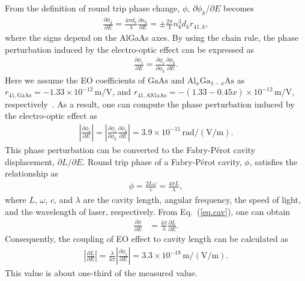 From the definition of round trip phase change, $\phi$, $\partial\phi_k/\partial E$ becomes
\begin{align}
\frac{\partial\phi_k}{\partial E} = \frac{4\pi d_k}{\lambda}\frac{\partial n_k}{\partial E} = \pm\frac{2\pi}{\lambda}n_k^3d_kr_{41,k},
\end{align}
where the signs depend on the AlGaAs axes.
By using the chain rule, the phase perturbation induced by the electro-optic effect can be expressed as
\begin{align}
    \frac{\partial\phi_{\mathrm{c}}}{\partial E} = \frac{\partial\phi_{\mathrm{c}}}{\partial\phi_k}\frac{\partial\phi_k}{\partial E}.
\end{align}
Here we assume the EO coefficients of $\mathrm{GaAs}$ and $\mathrm{Al}_{x}\mathrm{Ga}_{1-x}\mathrm{As}$ as $r_{41,\mathrm{GaAs}}=-1.33\times10^{-12}\, \mathrm{m/V}$, and $r_{41,\mathrm{AlGaAs}}=-(1.33-0.45x)\times10^{-12}\, \mathrm{m/V}$, respectively~\cite{adachi:1985, Abernathy2014}.
As a result, one can compute the phase perturbation induced by the electro-optic effect as
\begin{align}
    \left|\frac{\partial\phi_{\mathrm{c}}}{\partial E}\right| = \left|\frac{\partial\phi_{\mathrm{c}}}{\partial\phi_k}\frac{\partial\phi_k}{\partial E}\right| = 3.9 \times 10^{-11}\, \mathrm{rad/(V/m)}.
\end{align}
This phase perturbation can be converted to the Fabry-P\'erot cavity displacement, $\partial L/\partial E$.
Round trip phase of a Fabry-P\'erot cavity, $\phi$, satisfies the relationship as
\begin{align}
    \phi = \frac{2L\omega}{c} = \frac{4\pi L}{\lambda},
    \label{eq.cav}
\end{align}
where $L$, $\omega$, $c$, and $\lambda$ are the cavity length, angular frequency, the speed of light, and the wavelength of laser, respectively.
From Eq.~(\ref{eq.cav}), one can obtain
\begin{align}
    \frac{\partial\phi}{\partial E} &= \frac{4\pi}{\lambda}\frac{\partial L}{\partial E}.
\end{align}
Consequently, the coupling of EO effect to cavity length can be calculated as
\begin{align}
    \left|\frac{\partial L}{\partial E}\right| = \frac{\lambda}{4\pi}\left|\frac{\partial\phi_{\mathrm{c}}}{\partial E}\right| = 3.3\times10^{-18}\, \mathrm{m/(V/m)}.
\end{align}
This value is about one-third of the measured value.

